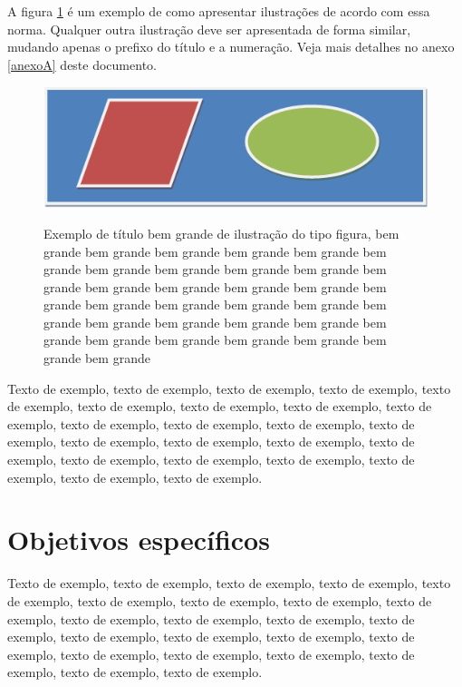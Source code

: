 \documentclass[
	12pt,				%
	oneside,			%
	a4paper,			%
	english,			%
	brazil				%
	]{abntex2ppgsi}
\begin{document}
A figura \ref{fig:figura-exemplo4} é um exemplo de como apresentar ilustrações de acordo com essa norma. Qualquer outra ilustração deve ser apresentada de forma similar, mudando apenas o prefixo do título e a numeração. Veja mais detalhes no anexo \ref{anexoA} deste documento.

\begin{figure}[htbp]
	\centering
	\caption{Exemplo de título bem grande de ilustração do tipo figura, bem grande bem grande bem grande bem grande bem grande bem grande bem grande bem grande bem grande bem grande bem grande bem grande bem grande bem grande bem grande bem grande bem grande bem grande bem grande bem grande bem grande bem grande bem grande bem grande bem grande bem grande bem grande bem grande bem grande bem grande bem grande bem grande}
		\includegraphics{figuras/figura-exemplo.png}
	\label{fig:figura-exemplo4}
\end{figure}

Texto de exemplo, texto de exemplo, texto de exemplo, texto de exemplo, texto de exemplo, texto de exemplo, texto de exemplo, texto de exemplo, texto de exemplo, texto de exemplo, texto de exemplo, texto de exemplo, texto de exemplo, texto de exemplo, texto de exemplo, texto de exemplo, texto de exemplo, texto de exemplo, texto de exemplo, texto de exemplo, texto de exemplo, texto de exemplo, texto de exemplo.

\section{Objetivos específicos}

Texto de exemplo, texto de exemplo, texto de exemplo, texto de exemplo, texto de exemplo, texto de exemplo, texto de exemplo, texto de exemplo, texto de exemplo, texto de exemplo, texto de exemplo, texto de exemplo, texto de exemplo, texto de exemplo, texto de exemplo, texto de exemplo, texto de exemplo, texto de exemplo, texto de exemplo, texto de exemplo, texto de exemplo, texto de exemplo, texto de exemplo.
\end{document}

